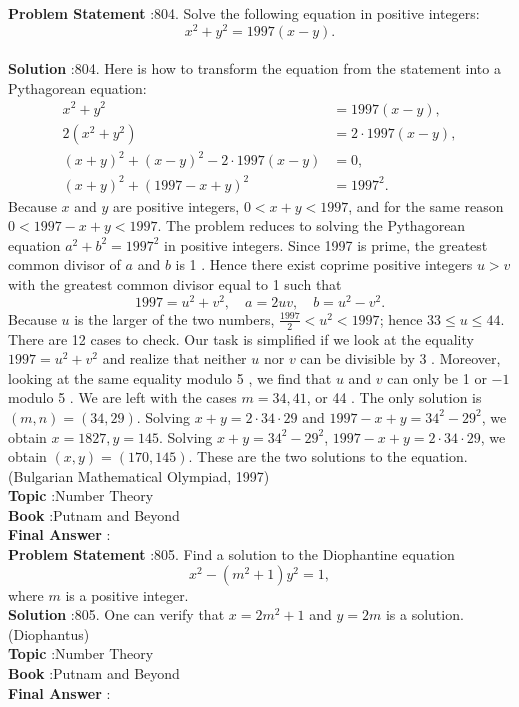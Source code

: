 \documentclass[10pt]{article}
\begin{document}
\textbf{Problem Statement} :804. Solve the following equation in positive integers:$$ x^{2}+y^{2}=1997(x-y) . $$\\
\textbf{Solution} :804. Here is how to transform the equation from the statement into a Pythagorean equation:$$ \begin{aligned} x^{2}+y^{2} &=1997(x-y), \\ 2\left(x^{2}+y^{2}\right) &=2 \cdot 1997(x-y), \\ (x+y)^{2}+(x-y)^{2}-2 \cdot 1997(x-y) &=0, \\ (x+y)^{2}+(1997-x+y)^{2} &=1997^{2} . \end{aligned} $$Because $x$ and $y$ are positive integers, $0<x+y<1997$, and for the same reason $0<1997-x+y<1997$. The problem reduces to solving the Pythagorean equation $a^{2}+b^{2}=1997^{2}$ in positive integers. Since 1997 is prime, the greatest common divisor of $a$ and $b$ is 1 . Hence there exist coprime positive integers $u>v$ with the greatest common divisor equal to 1 such that$$ 1997=u^{2}+v^{2}, \quad a=2 u v, \quad b=u^{2}-v^{2} . $$Because $u$ is the larger of the two numbers, $\frac{1997}{2}<u^{2}<1997$; hence $33 \leq u \leq 44$. There are 12 cases to check. Our task is simplified if we look at the equality $1997=u^{2}+v^{2}$ and realize that neither $u$ nor $v$ can be divisible by 3 . Moreover, looking at the same equality modulo 5 , we find that $u$ and $v$ can only be 1 or $-1$ modulo 5 . We are left with the cases $m=34,41$, or 44 . The only solution is $(m, n)=(34,29)$. Solving $x+y=2 \cdot 34 \cdot 29$ and $1997-x+y=34^{2}-29^{2}$, we obtain $x=1827, y=145$. Solving $x+y=34^{2}-29^{2}$, $1997-x+y=2 \cdot 34 \cdot 29$, we obtain $(x, y)=(170,145)$. These are the two solutions to the equation.(Bulgarian Mathematical Olympiad, 1997) \\
\textbf{Topic} :Number Theory\\
\textbf{Book} :Putnam and Beyond\\
\textbf{Final Answer} :\\


\textbf{Problem Statement} :805. Find a solution to the Diophantine equation$$ x^{2}-\left(m^{2}+1\right) y^{2}=1, $$where $m$ is a positive integer.\\
\textbf{Solution} :805. One can verify that $x=2 m^{2}+1$ and $y=2 m$ is a solution. (Diophantus)\\
\textbf{Topic} :Number Theory\\
\textbf{Book} :Putnam and Beyond\\
\textbf{Final Answer} :\\
\end{document}
